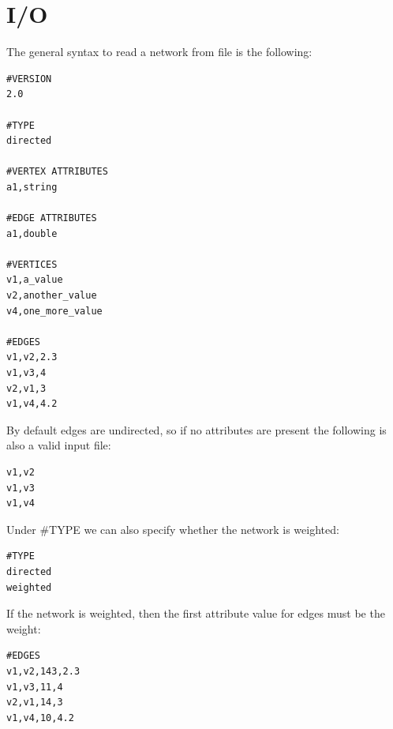 \section{I/O}  \label{ch:io}

The general syntax to read a network from file is the following:

\begin{lstlisting}[style=file]
#VERSION           
2.0                
                   
#TYPE              
directed           
                   
#VERTEX ATTRIBUTES 
a1,string          
                   
#EDGE ATTRIBUTES   
a1,double          
                   
#VERTICES          
v1,a_value         
v2,another_value   
v4,one_more_value  
                   
#EDGES             
v1,v2,2.3          
v1,v3,4            
v2,v1,3            
v1,v4,4.2          
\end{lstlisting}
By default edges are undirected, so if no attributes are present the following is also a valid input file:
\begin{lstlisting}[style=file]
v1,v2              
v1,v3              
v1,v4              
\end{lstlisting}
Under \#TYPE we can also specify whether the network is weighted:
\begin{lstlisting}[style=file]  
#TYPE              
directed           
weighted    
\end{lstlisting}        
If the network is weighted, then the first attribute value for edges must be the weight:
\begin{lstlisting}[style=file]         
#EDGES             
v1,v2,143,2.3      
v1,v3,11,4         
v2,v1,14,3         
v1,v4,10,4.2       
\end{lstlisting}
    
